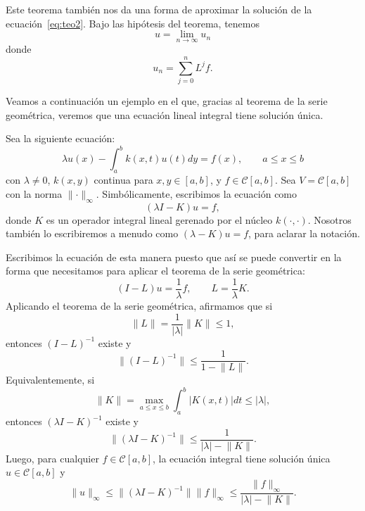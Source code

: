 \begin{observacion}
	Este teorema también nos da una forma de aproximar la solución de la ecuación~\eqref{eq:teo2}. Bajo las hipótesis del teorema, tenemos
	\begin{equation}
		u = \lim_{n \rightarrow \infty}u_n
	\end{equation}
	donde
	\begin{equation}
		u_n = \sum_{j=0}^{n}L^jf.
	\end{equation}
\end{observacion}
Veamos a continuación un ejemplo en el que, gracias al teorema de la serie geométrica, veremos que una ecuación lineal integral tiene solución única.
\begin{ejemplo}\label{ej:1}
	Sea la siguiente ecuación:
	\begin{equation}
		\lambda u(x) - \int_{a}^{b}k(x,t)u(t)dy = f(x), \qquad a \leqslant x \leqslant b
	\end{equation}
	con $\lambda \neq 0$, $k(x,y)$ continua para $x,y \in [a,b]$, y $f \in \mathcal{C}[a,b]$. Sea $V = \mathcal{C}[a,b]$ con la norma $\lVert \cdot \rVert_\infty$. Simbólicamente, escribimos la ecuación como
	\begin{equation}
		(\lambda I-K)u = f,
	\end{equation}
	donde $K$ es un operador integral lineal gerenado por el núcleo $k(\cdot , \cdot )$. Nosotros también lo escribiremos a menudo como $(\lambda - K)u = f$, para aclarar la notación.
	
	Escribimos la ecuación de esta manera puesto que así se puede convertir en la forma que necesitamos para aplicar el teorema de la serie geométrica:
	\begin{equation}
		(I-L)u = \dfrac{1}{\lambda}f, \qquad L = \dfrac{1}{\lambda}K.
	\end{equation}
	Aplicando el teorema de la serie geométrica, afirmamos que si
	\begin{equation}
		\lVert L \rVert = \dfrac{1}{|\lambda |}\lVert K \rVert \leq 1,
	\end{equation}
	entonces $(I-L)^{-1}$ existe y
	\begin{equation}
		\lVert(I-L)^{-1}\rVert \leqslant \dfrac{1}{1 - \lVert L \rVert}.
	\end{equation}
	Equivalentemente, si
	\begin{equation}
		\lVert K \rVert = \max_{a\leqslant x\leqslant b}\int_{a}^{b}|K(x,t)|dt \leq |\lambda|,
	\end{equation}
	entonces $(\lambda I - K)^{-1}$ existe y 
	\begin{equation}
		\lVert (\lambda I - K)^{-1}\rVert \leqslant \dfrac{1}{|\lambda| - \lVert K \rVert }.
	\end{equation}
	Luego, para cualquier $f \in \mathcal{C}[a,b]$, la ecuación integral tiene solución única $u \in \mathcal{C}[a,b]$ y 
	\begin{equation}
		\lVert u \rVert_\infty \leqslant \lVert (\lambda I - K)^{-1} \rVert \lVert f \rVert_\infty \leqslant \dfrac{\lVert f \rVert_\infty}{|\lambda| - \lVert K \rVert }.
	\end{equation}
\end{ejemplo}
